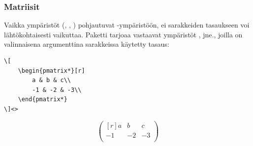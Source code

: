\begin{frame}[fragile]
    \frametitle{Matriisit}
    Vaikka ympäristöt  (, , ) pohjautuvat -ympäristöön, ei sarakkeiden tasaukseen voi lähtökohtaisesti vaikuttaa. \vaihto Paketti  tarjoaa vastaavat ympäristöt ,  jne., joilla on valinnaisena argumenttina sarakkeissa käytetty tasaus:\vaihto

    \begin{minipage}{5cm}
        \begin{lstlisting}
\[
    \begin{pmatrix*}[r]
        a & b & c\\
        -1 & -2 & -3\\
    \end{pmatrix*}
\]<>
        \end{lstlisting}
    \end{minipage}
    \begin{minipage}{5cm}
        \[
            \begin{pmatrix*}[r]
                a & b & c\\
                -1 & -2 & -3\\
            \end{pmatrix*}
        \]
    \end{minipage}
\end{frame}

